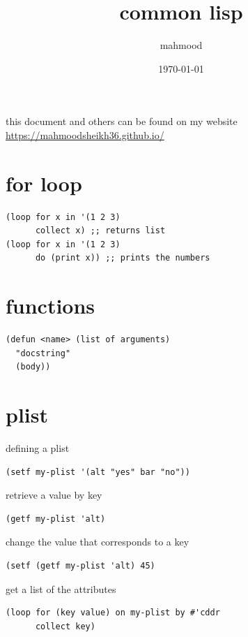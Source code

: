 \documentclass[a4paper,12pt]{article}
\author{mahmood}
\date{\today}
\title{common lisp}
\begin{document}
\maketitle
\begin{note}
this document and others can be found on my website\\
\url{https://mahmoodsheikh36.github.io/}
\end{note}
\section{for loop}
\label{sec:org485014a}
\lstset{language=Lisp,label= ,caption= ,captionpos=b,numbers=none}
\begin{lstlisting}
(loop for x in '(1 2 3)
      collect x) ;; returns list
(loop for x in '(1 2 3)
      do (print x)) ;; prints the numbers
\end{lstlisting}
\section{functions}
\label{sec:org1e257b2}
\lstset{language=Lisp,label= ,caption= ,captionpos=b,numbers=none}
\begin{lstlisting}
(defun <name> (list of arguments)
  "docstring"
  (body))
\end{lstlisting}
\section{plist}
\label{sec:org918814f}
defining a plist\\
\lstset{language=Lisp,label= ,caption= ,captionpos=b,numbers=none}
\begin{lstlisting}
(setf my-plist '(alt "yes" bar "no"))
\end{lstlisting}
retrieve a value by key\\
\lstset{language=Lisp,label= ,caption= ,captionpos=b,numbers=none}
\begin{lstlisting}
(getf my-plist 'alt)
\end{lstlisting}
change the value that corresponds to a key\\
\lstset{language=Lisp,label= ,caption= ,captionpos=b,numbers=none}
\begin{lstlisting}
(setf (getf my-plist 'alt) 45)
\end{lstlisting}
get a list of the attributes\\
\lstset{language=Lisp,label= ,caption= ,captionpos=b,numbers=none}
\begin{lstlisting}
(loop for (key value) on my-plist by #'cddr
      collect key)
\end{lstlisting}
\end{document}
